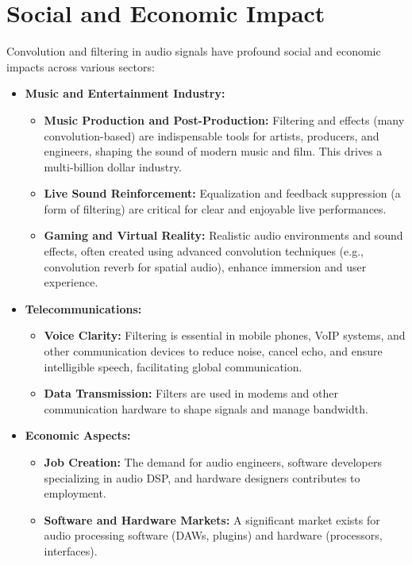 \documentclass[12pt, a4paper]{article}
\begin{document}
\section{Social and Economic Impact}
\label{sec:social_economic_impact}

Convolution and filtering in audio signals have profound social and economic impacts across various sectors:

\begin{itemize}
    \item \textbf{Music and Entertainment Industry:}
    \begin{itemize}
        \item \textbf{Music Production and Post-Production:} Filtering and effects (many convolution-based) are indispensable tools for artists, producers, and engineers, shaping the sound of modern music and film. This drives a multi-billion dollar industry.
        \item \textbf{Live Sound Reinforcement:} Equalization and feedback suppression (a form of filtering) are critical for clear and enjoyable live performances.
        \item \textbf{Gaming and Virtual Reality:} Realistic audio environments and sound effects, often created using advanced convolution techniques (e.g., convolution reverb for spatial audio), enhance immersion and user experience.
    \end{itemize}
    
    \item \textbf{Telecommunications:}
    \begin{itemize}
        \item \textbf{Voice Clarity:} Filtering is essential in mobile phones, VoIP systems, and other communication devices to reduce noise, cancel echo, and ensure intelligible speech, facilitating global communication.
        \item \textbf{Data Transmission:} Filters are used in modems and other communication hardware to shape signals and manage bandwidth.
    \end{itemize}
    
    \item \textbf{Economic Aspects:}
    \begin{itemize}
        \item \textbf{Job Creation:} The demand for audio engineers, software developers specializing in audio DSP, and hardware designers contributes to employment.
        \item \textbf{Software and Hardware Markets:} A significant market exists for audio processing software (DAWs, plugins) and hardware (processors, interfaces).
    \end{itemize}
\end{itemize}
\end{document}
